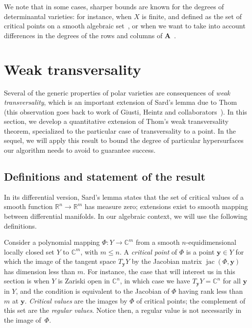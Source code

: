 \documentclass[12pt]{article}
\DeclareMathOperator{\jac}{jac}
\def\C{\mathbb{C}}
\def\R{\mathbb{R}}
\begin{document}
We note that in some cases, sharper bounds are known for the degrees
of determinantal varieties: for instance, when $X$ is finite, and
defined as the set of critical points on a smooth algebraic
set~\cite{SaSp16}, or when we want to take into account differences in
the degrees of the rows and columns of $\bm
A$~\cite{Spa14,NieRan09,HaSaScVu18}.


\section{Weak transversality}\label{sec:wt}

Several of the generic properties of polar varieties are consequences
of {\em weak transversality}, which is an important extension of
Sard's lemma due to Thom (this observation goes back to work of
Giusti, Heintz and collaborators~\cite{BaGiHeMb97,BaGiHeLePa12}).  In
this section, we develop a quantitative extension of Thom's weak
transversality theorem, specialized to the particular case of
transversality to a point. In the sequel, we will apply this result to
bound the degree of particular hypersurfaces our algorithm needs to
avoid to guarantee success.


\subsection{Definitions and statement of the result}

In its differential version, Sard's lemma states that the set of
critical values of a smooth function $\R^n \to \R^m$ has measure zero;
extensions exist to smooth mapping between differential manifolds.  In
our algebraic context, we will use the following definitions.

Consider a polynomial mapping $\Phi : Y \rightarrow \C^m$ from a
smooth $n$-equidimensional locally closed set $Y$ to $\C^m$, with
$m\le n$. A {\em critical point} of $\Phi$ is a point $\bm y \in Y$
for which the image of the tangent space $T_{\bm y} Y$ by the Jacobian
matrix $\jac(\Phi,\bm y)$ has dimension less than $m$. For instance,
the case that will interest us in this section is when $Y$ is Zariski
open in $\C^n$, in which case we have $T_{\bm y} Y=\C^n$ for all $\bm
y$ in $Y$, and the condition is equivalent to the Jacobian of $\Phi$
having rank less than $m$ at $\bm y$. {\em Critical values} are the
images by $\Phi$ of critical points; the complement of this set are
the {\em regular values}. Notice then, a regular value is not
necessarily in the image of~$\Phi$.
\end{document}
